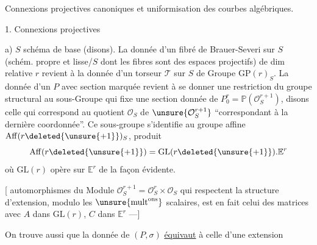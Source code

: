 Connexions projectives canoniques et uniformisation des courbes algébriques.

1. Connexions projectives

 a) $S$ schéma de base (disons). La donnée d'un fibré de Brauer-Severi  sur $S$ (schém. propre et lisse/$S$ dont les fibres  sont des espaces projectifs) de dim relative  $r$ revient à la donnée d'un torseur $\mathcal{T}$ sur $S$ de Groupe $\mathrm{GP}(r)_S$. La donnée d'un $P$ avec section marquée revient à se donner une restriction du groupe structural au sous-Groupe  qui fixe une section donnée de  $P_0^r=\mathbb{P}(\mathcal{O}_S^{r+1})$, disons celle qui correspond au quotient $\mathcal{O}_S$ de $\unsure{\mathcal{O}_S^{r+1}}$ ``correspondant à la dernière coordonnée''. Ce sous-groupe s'identifie au groupe affine $\mathrm{Aff}(r\deleted{\unsure{+1}})_S$, produit 
\[
\mathrm{Aff}(r\deleted{\unsure{+1}})=\mathrm{GL}(r\deleted{\unsure{+1}}).\mathbb{E}^r
\]
où $\mathrm{GL}(r)$ opère sur $\mathbb{E}^r$ de la façon évidente.

[  automorphismes du Module $\mathcal{O}_S^{r+1}=\mathcal{O}_S^r\times\mathcal{O}_S$  qui respectent la structure d'extension, modulo les $\unsure{\mathrm{mult}^{\mathrm{ons}}}$ scalaires,  est en fait celui des matrices
avec $A$  dans $\mathrm{GL}(r)$, $C$ dans $\mathbb{E}^r$ ---]

On trouve aussi que la donnée de $(P,\sigma)$ \uline{équivaut} à celle d'une extension
